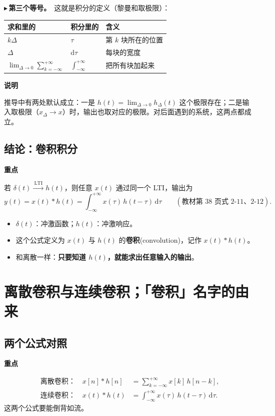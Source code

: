 \documentclass[UTF8,a4paper,11pt]{ctexart}
\newenvironment{remember}{\begin{rememberbox}\textbf{重点}\par\smallskip}{\end{rememberbox}}
\newenvironment{note}{\begin{notebox}\textbf{说明}\par\smallskip}{\end{notebox}}
\newcounter{ex}[section]
\newcommand{\point}[1]{\par\addvspace{1ex}\noindent\textcolor{ptteal}{$\blacktriangleright$\,\textbf{#1}}\ }
\begin{document}
\point{第三个等号。}这就是积分的定义（黎曼和取极限）：

\begin{center}
\begin{tabular}{@{}lll@{}}
\toprule
求和里的 & 积分里的 & 含义\\
\midrule
$k\Delta$ & $\tau$ & 第 $k$ 块所在的位置\\
$\Delta$ & $\mathrm{d}\tau$ & 每块的宽度\\
$\displaystyle\lim_{\Delta\to0}\sum_{k=-\infty}^{+\infty}$ & $\displaystyle\int_{-\infty}^{+\infty}$ & 把所有块加起来\\
\bottomrule
\end{tabular}
\end{center}

\begin{note}
推导中有两处默认成立：一是 $h(t)=\lim_{\Delta\to0}h_\Delta(t)$ 这个极限存在；二是输入取极限（$x_\Delta\to x$）时，输出也取对应的极限。对后面遇到的系统，这两点都成立。
\end{note}

\subsection{结论：卷积积分}
\begin{remember}
若 $\delta(t)\xrightarrow{\ \text{LTI}\ }h(t)$，则任意 $x(t)$ 通过同一个 LTI，输出为
\[
y(t)=x(t)\ast h(t)=\int_{-\infty}^{+\infty}x(\tau)\,h(t-\tau)\,\mathrm{d}\tau\qquad(\text{教材第 38 页式 2-11、2-12}).
\]
\begin{itemize}[nosep]
\item $\delta(t)$：冲激函数；$h(t)$：冲激响应。
\item 这个公式定义为 $x(t)$ 与 $h(t)$ 的\textbf{卷积}(convolution)，记作 $x(t)\ast h(t)$。
\item 和离散一样：\textbf{只要知道 $h(t)$，就能求出任意输入的输出}。
\end{itemize}
\end{remember}

\section{离散卷积与连续卷积；「卷积」名字的由来}\label{sec:name}
\subsection{两个公式对照}
\begin{remember}
\begin{align*}
\text{离散卷积：}\quad x[n]\ast h[n]&=\sum_{k=-\infty}^{+\infty}x[k]\,h[n-k],\\
\text{连续卷积：}\quad x(t)\ast h(t)&=\int_{-\infty}^{+\infty}x(\tau)\,h(t-\tau)\,\mathrm{d}\tau .
\end{align*}
这两个公式要能倒背如流。
\end{remember}
\end{document}
